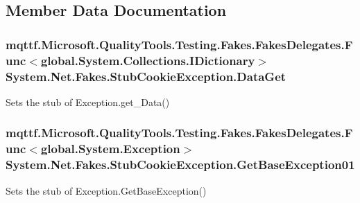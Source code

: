 \subsection{Member Data Documentation}
\hypertarget{class_system_1_1_net_1_1_fakes_1_1_stub_cookie_exception_aeb201bd2115e69c44fad955cce461481}{
\subsubsection[{Data\-Get}]{\setlength{\rightskip}{0pt plus 5cm}mqttf.\-Microsoft.\-Quality\-Tools.\-Testing.\-Fakes.\-Fakes\-Delegates.\-Func$<$global.\-System.\-Collections.\-I\-Dictionary$>$ System.\-Net.\-Fakes.\-Stub\-Cookie\-Exception.\-Data\-Get}}\label{class_system_1_1_net_1_1_fakes_1_1_stub_cookie_exception_aeb201bd2115e69c44fad955cce461481}


Sets the stub of Exception.\-get\-\_\-\-Data()

\hypertarget{class_system_1_1_net_1_1_fakes_1_1_stub_cookie_exception_ac04d1154ddd4ebfd5e6543b178f9aa9d}{
\subsubsection[{Get\-Base\-Exception01}]{\setlength{\rightskip}{0pt plus 5cm}mqttf.\-Microsoft.\-Quality\-Tools.\-Testing.\-Fakes.\-Fakes\-Delegates.\-Func$<$global.\-System.\-Exception$>$ System.\-Net.\-Fakes.\-Stub\-Cookie\-Exception.\-Get\-Base\-Exception01}}\label{class_system_1_1_net_1_1_fakes_1_1_stub_cookie_exception_ac04d1154ddd4ebfd5e6543b178f9aa9d}


Sets the stub of Exception.\-Get\-Base\-Exception()


